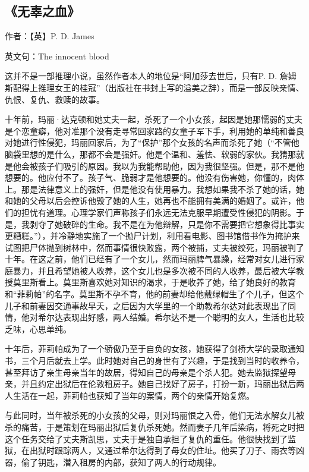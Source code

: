 \subsection{《无辜之血》}

作者：【英】P. D. James

英文句：The innocent blood

这并不是一部推理小说，虽然作者本人的地位是“阿加莎去世后，只有P. D. 詹姆斯配得上推理女王的桂冠”（出版社在书封上写的溢美之辞），而是一部反映亲情、仇恨、复仇、救赎的故事。

十年前，玛丽·达克顿和她丈夫一起，杀死了一个小女孩，起因是她那懦弱的丈夫是个恋童癖，他对准那个没有走寻常回家路的女童子军下手，利用她的单纯和善良对她进行性侵犯，玛丽回家后，为了“保护”那个女孩的名声而杀死了她（“不管他脑袋里想的是什么，那都不会是强奸。他是个温和、羞怯、软弱的家伙。我猜那就是他会被孩子们吸引的原因。我以为我能帮助他，因为我很坚强。但是，那不是他想要的。他应付不了。孩子气、脆弱才是他想要的。他没有伤害她，你懂的，肉体上。那是法律意义上的强奸，但是他没有使用暴力。我想如果我不杀了她的话，她和她的父母以后会控诉他毁了她的人生，她再也不能拥有美满的婚姻了。或许，他们的担忧有道理。心理学家们声称孩子们永远无法克服早期遭受性侵犯的阴影。于是，我剥夺了她破碎的生命。我不是在为他辩解，只是你不需要把它想象得比事实更糟糕。”），并冷静地实施了一个抛尸计划，利用看电影、图书馆借书作为掩护来试图把尸体抛到树林中，然而事情很快败露，两个被捕，丈夫被绞死，玛丽被判了十年。在这之前，他们已经有了一个女儿，然而玛丽脾气暴躁，经常对女儿进行家庭暴力，并且希望她被人收养，这个女儿也是多次被不同的人收养，最后被大学教授莫里斯看上。莫里斯喜欢她对知识的渴求，于是收养了她，给了她良好的教育和“菲莉帕”的名字。莫里斯不孕不育，他的前妻却给他戴绿帽生了个儿子，但这个儿子和前妻因交通事故早夭，之后因为大学里的一个助教希尔达对此表现出了同情，他对希尔达表现出好感，两人结婚。希尔达不是一个聪明的女人，生活也比较乏味，心思单纯。

十年后，菲莉帕成为了一个骄傲乃至于自负的女孩，她获得了剑桥大学的录取通知书，三个月后就去上学。此时她对自己的身世有了兴趣，于是找到当时的收养令，甚至拜访了亲生母亲当年的故居，得知自己的母亲是个杀人犯。她去监狱探望母亲，并且约定出狱后在伦敦租房子。她自己找好了房子，打扮一新，玛丽出狱后两人生活在一起，菲莉帕也获知了当年的案情，两个的亲情开始复燃。

与此同时，当年被杀死的小女孩的父母，则对玛丽恨之入骨，他们无法水解女儿被杀的痛苦，于是策划在玛丽出狱后复仇杀死她。然而妻子几年后染病，将死之时把这个任务交给了丈夫斯凯思，丈夫于是独自承担了复仇的重任。他很快找到了监狱，在出狱时跟踪两人，又通过希尔达得到了母女的住址。他买了刀子、雨衣等凶器，偷了钥匙，潜入租房的内部，获知了两人的行动规律。

